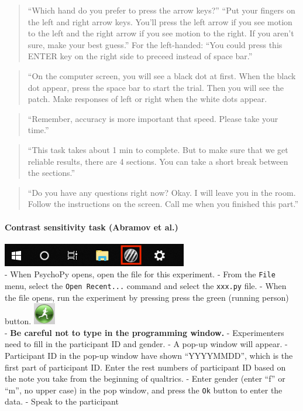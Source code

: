 \documentclass[]{article}
\let\oldparagraph\paragraph
\renewcommand{\paragraph}[1]{\oldparagraph{#1}\mbox{}}
\begin{document}
\begin{quote}
``Which hand do you prefer to press the arrow keys?'' ``Put your fingers
on the left and right arrow keys. You'll press the left arrow if you see
motion to the left and the right arrow if you see motion to the right.
If you aren't sure, make your best guess.'' For the left-handed: ``You
could press this ENTER key on the right side to preceed instead of space
bar.''
\end{quote}

\begin{quote}
``On the computer screen, you will see a black dot at first. When the
black dot appear, press the space bar to start the trial. Then you will
see the patch. Make responses of left or right when the white dots
appear.
\end{quote}

\begin{quote}
``Remember, accuracy is more important that speed. Please take your
time.''
\end{quote}

\begin{quote}
``This task takes about 1 min to complete. But to make sure that we get
reliable results, there are 4 sections. You can take a short break
between the sections.''
\end{quote}

\begin{quote}
``Do you have any questions right now? Okay. I will leave you in the
room. Follow the instructions on the screen. Call me when you finished
this part.''
\end{quote}

\paragraph{Contrast sensitivity task (Abramov et
al.)}\label{contrast-sensitivity-task-abramov-et-al.}

\includegraphics{images/PsychoPy-1.PNG}\\
- When PsychoPy opens, open the file for this experiment. - From the
\texttt{File} menu, select the \texttt{Open\ Recent...} command and
select the \texttt{xxx.py} file. - When the file opens, run the
experiment by pressing press the green (running person) button.
\includegraphics{images/PPrunningMan.png}\\
- \textbf{Be careful not to type in the programming window.} -
Experimenters need to fill in the participant ID and gender. - A pop-up
window will appear. - Participant ID in the pop-up window have shown
``YYYYMMDD'', which is the first part of participant ID. Enter the rest
numbers of participant ID based on the note you take from the beginning
of qualtrics. - Enter gender (enter ``f'' or ``m'', no upper case) in
the pop window, and press the \texttt{Ok} button to enter the data. -
Speak to the participant
\end{document}
